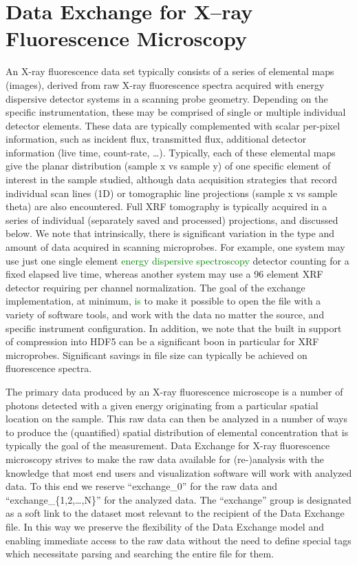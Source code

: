 \documentclass[pdf]{iucr}              %
\begin{document}
\section{Data Exchange for X--ray Fluorescence Microscopy}

An X-ray fluorescence data set typically consists of a series of elemental maps (images), derived from raw X-ray fluorescence spectra acquired with energy dispersive detector systems in a scanning probe geometry. Depending on the specific instrumentation, these may be comprised of single or multiple individual detector elements. These data are typically complemented with scalar per-pixel information, such as incident flux, transmitted flux, additional detector information (live time, count-rate, \ldots). Typically, each of these elemental maps give the planar distribution (sample x vs sample y) of one specific element of interest in the sample studied, although data acquisition strategies that record individual scan lines (1D) or tomographic line projections (sample x vs sample theta) are also encountered. Full XRF tomography is typically acquired in a series of individual (separately saved and processed) projections, and discussed below. We note that intrinsically, there is significant variation in the type and amount of data acquired in scanning microprobes. For example, one system may use just one single element \textcolor{green}{energy dispersive spectroscopy} detector counting for a fixed elapsed live time, whereas another system may use a 96 element XRF detector requiring per channel normalization. The goal of the exchange implementation, at minimum, \textcolor{green}{is} to make it possible to open the file with a variety of software tools, and work with the data no matter the source, and specific instrument configuration. In addition, we note that the built in support of compression into HDF5 can be a significant boon in particular for XRF microprobes. Significant savings in file size can typically be achieved on fluorescence spectra. 

The primary data produced by an X-ray fluorescence microscope is a number of photons detected with a given energy originating from a particular spatial location on the sample. This raw data can then be analyzed in a number of ways to produce the (quantified) spatial distribution of elemental concentration that is typically the goal of the measurement. Data Exchange for X-ray fluorescence microscopy strives to make the raw data available for (re-)analysis with the knowledge that most end users and visualization software will work with analyzed data. To this end we reserve ``exchange\_0'' for the raw data and ``exchange\_\{1,2,\ldots,N\}'' for the analyzed data. The ``exchange'' group is designated as a soft link to the dataset most relevant to the recipient of the Data Exchange file. In this way we preserve the flexibility of the Data Exchange model and enabling immediate access to the raw data without the need to define special tags which necessitate parsing and searching the entire file for them.
\end{document}
